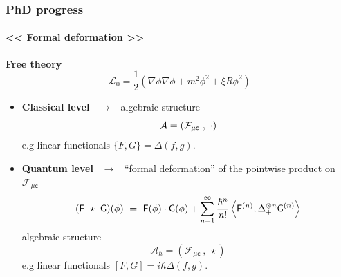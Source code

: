 \documentclass[9pt]{beamer}
\newcommand{\Smearip}[1]{\left\langle #1 \right\rangle} %
\newcommand{\Acal}{\mathcal{A}}
\newcommand{\Fcal}{\mathcal{F}}
\newcommand{\Lcal}{\mathcal{L}}
\newcommand{\Fsf}{\mathsf{F}}
\newcommand{\Gsf}{\mathsf{G}}
\newcommand{\csf}{\mathsf{c}}
\begin{document}

\begin{frame}

\frametitle{PhD progress}
\framesubtitle{<< Formal deformation >>}

\textbf{Free theory}
%
\begin{equation*}
\Lcal_0 = \frac{1}{2} \left( \nabla \phi \nabla \phi + m^2 \phi^2 + \xi R \phi^2 \right)
\end{equation*}

\begin{itemize}
% 
\item \textbf{Classical level} \ $\to$ \ algebraic structure 
%
\vspace*{-12pt}
%
\begin{equation*}
\Acal = \left( \Fcal_{\mu\csf} \ , \ \cdot \right) 
\vspace*{-10pt}
\end{equation*}
%
e.g linear functionals $\{F,G\} = \Delta(f,g)$. 
%
\item \textbf{Quantum level}  \ $\to$ \ ``formal deformation'' of the pointwise product on $\Fcal_{\mu\csf}$
%
\begin{equation*}
(\Fsf \ \star \ \Gsf)(\phi) \ = \ \Fsf(\phi) \cdot \Gsf(\phi) + \sum_{n=1}^{\infty} \frac{\hbar^n}{n!} \Smearip{\Fsf^{(n)},\Delta_{+}^{\otimes n} \Gsf^{(n)}}
\vspace*{-10pt}
\end{equation*}
%
algebraic structure 
\begin{equation*}
\Acal_\hbar = \left( \Fcal_{\mu\csf} \ , \ \star \right)
\end{equation*}
%
e.g linear functionals $\left[F,G\right] = i \hbar \Delta(f,g)$. 
%
\end{itemize}

\end{frame}  

\end{document}
